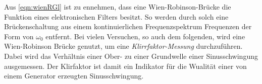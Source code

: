 Aus \autoref{eqn:wienRGl} ist zu ennehmen, dass eine Wien-Robinson-Brücke die Funktion eines elektronischen Filters besitzt.
So werden durch solch eine Brückenschaltung aus einem kontinuierlichen Frequenzspektrum Frequenzen der Form von $\omega_0$
entfernt. 
Bei vielen Versuchen, so auch dem folgenden, wird eine Wien-Robinson Brücke genutzt, um eine \textit{Klirrfaktor-Messung}
durchzuführen. Dabei wird das Verhältnis einer Ober- zu einer Grundwelle einer Sinusschwingung ausgemessen. Der Klirfaktor
ist damit ein Indikator für die Wualität einer von einem Generator erzeugten Sinusschwingung.